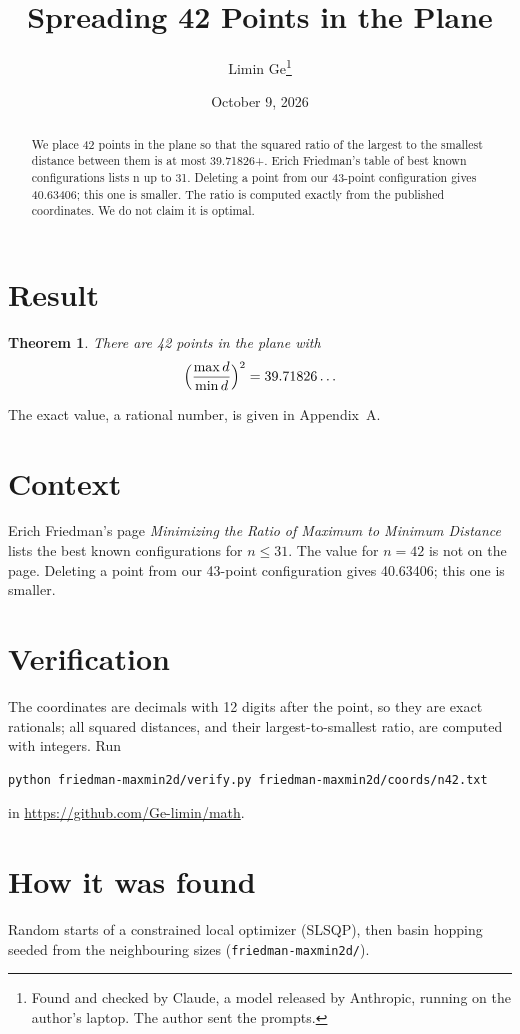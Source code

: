 \documentclass[11pt,a4paper]{article}
\title{Spreading 42 Points in the Plane}
\author{Limin Ge\thanks{Found and checked by Claude, a model released by Anthropic, running on the author's laptop. The author sent the prompts.}}
\date{October 9, 2026}
\newtheorem*{theorem}{Theorem}
\begin{document}
\maketitle
\begin{abstract}
We place 42 points in the plane so that the squared ratio of the largest to the smallest distance between them is at most 39.71826+. Erich Friedman's table of best known configurations lists n up to 31. Deleting a point from our 43-point configuration gives 40.63406; this one is smaller. The ratio is computed exactly from the published coordinates. We do not claim it is optimal.
\end{abstract}

\section{Result}
\begin{theorem}
There are 42 points in the plane with
\[ \Bigl(\frac{\max d}{\min d}\Bigr)^2 = 39.71826\ldots \]
\end{theorem}
The exact value, a rational number, is given in Appendix~A.


\section{Context}
Erich Friedman's page \emph{Minimizing the Ratio of Maximum to Minimum Distance} lists the best known configurations for $n\le 31$. The value for $n=42$ is not on the page. Deleting a point from our 43-point configuration gives 40.63406; this one is smaller.


\section{Verification}
The coordinates are decimals with 12 digits after the point, so they are exact rationals; all squared distances, and their largest-to-smallest ratio, are computed with integers. Run
\begin{verbatim}
python friedman-maxmin2d/verify.py friedman-maxmin2d/coords/n42.txt
\end{verbatim}
in \url{https://github.com/Ge-limin/math}.


\section{How it was found}
Random starts of a constrained local optimizer (SLSQP), then basin hopping seeded from the neighbouring sizes (\texttt{friedman-maxmin2d/}).
\end{document}
